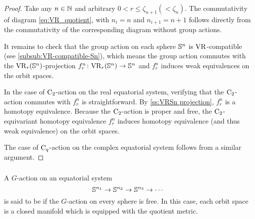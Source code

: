 \begin{proof}
    Take any $n \in \mathbb{N}$ and arbitrary $0 < r \leq \zeta_{n+1} (< \zeta_{n})$.
    The commutativity of diagram \ref{eq:VR_quotient}, with $n_i = n$ and $n_{i+1} = n+1$ follows directly from the commutativity of the corresponding diagram without group actions.

    It remains to check that the group action on each sphere $\mathbb{S}^n$ is \(\mathrm{VR}\)-compatible (see \cref{subsub:VR-compatible-Sn}), which means the group action commutes with the $\mathrm{VR}_r(\mathbb{S}^{n})$-projection $f_r^{n}\colon \mathrm{VR}_r(\mathbb{S}^{n}) \to \mathbb{S}^{n}$ and $f_r^{n}$ induces weak equivalences on the orbit spaces.
    
    In the case of $\mathrm{C}_2$-action on the real equatorial system, verifying that the $\mathrm{C}_2$-action commutes with $f_r^{n}$ is straightforward.
    By \cref{ss:VRSn projection}, $f_r^{n}$ is a homotopy equivalence.
    Because the $\mathrm{C}_2$-action is proper and free, the $\mathrm{C}_2$-equivariant homotopy equivalence $f_r^n$ induces homotopy equivalence (and thus weak equivalence) on the orbit spaces.

    The case of $\mathrm{C}_q$-action on the complex equatorial system follows from a similar argument.
\end{proof}

\subsubsection{}\label{subsub:foundamental_bar_rpn_lemma}

A \(G\)-action on an equatorial system
\[
\mathbb{S}^{n_1} \to \mathbb{S}^{n_2} \to \mathbb{S}^{n_3} \to \dotsb
\]
is said to be  if the \(G\)-action on every sphere is free.
In this case, each orbit space is a closed manifold which is equipped with the quotient metric.


